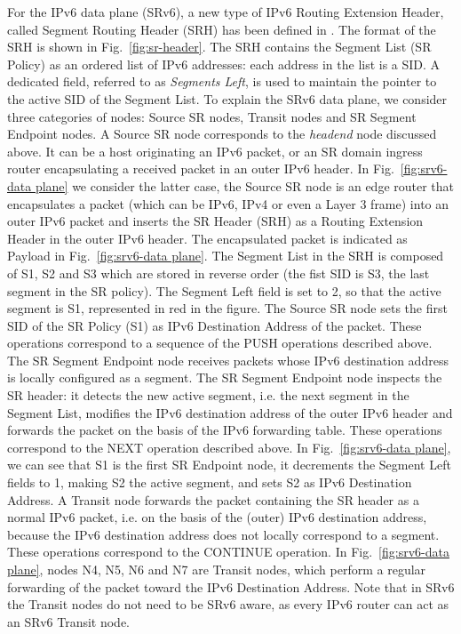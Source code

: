 For the IPv6 data plane (SRv6), a new type of IPv6 Routing Extension Header, called Segment Routing Header (SRH) has been defined in \cite{ietf-6man-segment-routing-header}. The format of the SRH is shown in Fig.~\ref{fig:sr-header}. The SRH contains the Segment List (SR Policy) as an ordered list of IPv6 addresses: each address in the list is a SID. A dedicated field, referred to as \textit{Segments Left}, is used to maintain the pointer to the active SID of the Segment List. To explain the SRv6 data plane, we consider three categories of nodes: Source SR nodes, Transit nodes and SR Segment Endpoint nodes. A Source SR node corresponds to the \textit{headend} node discussed above. It can be a host originating an IPv6 packet, or an SR domain ingress router encapsulating a received packet in an outer IPv6 header. In Fig.~\ref{fig:srv6-data plane} we consider the latter case, the Source SR node is an edge router that encapsulates a packet (which can be IPv6, IPv4 or even a Layer 3 frame) into an outer IPv6 packet and inserts the SR Header (SRH) as a Routing Extension Header in the outer IPv6 header. The encapsulated packet is indicated as Payload in Fig.~\ref{fig:srv6-data plane}. The Segment List in the SRH is composed of S1, S2 and S3 which are stored in reverse order (the fist SID is S3, the last segment in the SR policy). The Segment Left field is set to 2, so that the active segment is S1, represented in red in the figure. The Source SR node sets the first SID of the SR Policy (S1) as IPv6 Destination Address of the packet. These operations correspond to a sequence of the PUSH operations described above. The SR Segment Endpoint node receives packets whose IPv6 destination address is locally configured as a segment. The SR Segment Endpoint node inspects the SR header: it detects the new active segment, i.e. the next segment in the Segment List, modifies the IPv6 destination address of the outer IPv6 header and forwards the packet on the basis of the IPv6 forwarding table. These operations correspond to the NEXT operation described above. In Fig.~\ref{fig:srv6-data plane}, we can see that S1 is the first SR Endpoint node, it decrements the Segment Left fields to 1, making S2 the active segment, and sets S2 as IPv6 Destination Address. A Transit node forwards the packet containing the SR header as a normal IPv6 packet, i.e. on the basis of the (outer) IPv6 destination address, because the IPv6 destination address does not locally correspond to a segment. These operations correspond to the CONTINUE operation. In Fig.~\ref{fig:srv6-data plane}, nodes N4, N5, N6 and N7 are Transit nodes, which perform a regular forwarding of the packet toward the IPv6 Destination Address. Note that in SRv6 the Transit nodes do not need to be SRv6 aware, as every IPv6 router can act as an SRv6 Transit node. 

